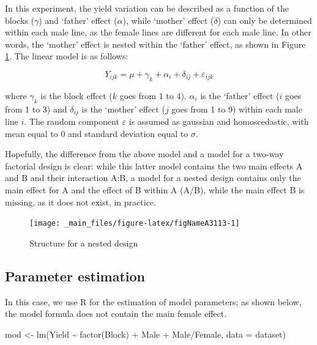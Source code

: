 \documentclass[a4paper,12pt,oneside]{book}
\newenvironment{Shaded}{\begin{snugshade}}{\end{snugshade}}
\newcommand{\SpecialCharTok}[1]{#1}
\newcommand{\OtherTok}[1]{#1}
\newcommand{\FunctionTok}[1]{#1}
\newcommand{\AttributeTok}[1]{#1}
\newcommand{\NormalTok}[1]{#1}
\begin{document}
In this experiment, the yield variation can be described as a function of the blocks (\(\gamma\)) and `father' effect (\(\alpha\)), while `mother' effect (\(\delta\)) can only be determined within each male line, as the female lines are different for each male line. In other words, the `mother' effect is nested within the `father' effect, as shown in Figure \ref{fig:figNameA3113}. The linear model is as follows:

\[Y_{ijk} = \mu + \gamma_k + \alpha_i + \delta_{ij} + \varepsilon_{ijk}\]

where \(\gamma_k\) is the block effect (\(k\) goes from 1 to 4), \(\alpha_i\) is the `father' effect (\(i\) goes from 1 to 3) and \(\delta_{ij}\) is the `mother' effect (\(j\) goes from 1 to 9) within each male line \(i\). The random component \(\varepsilon\) is assumed as gaussian and homoscedastic, with mean equal to 0 and standard deviation equal to \(\sigma\).

Hopefully, the difference from the above model and a model for a two-way factorial design is clear: while this latter model contains the two main effects A and B and their interaction A:B, a model for a nested design contains only the main effect for A and the effect of B within A (A/B), while the main effect B is missing, as it does not exist, in practice.

\begin{figure}

{\centering \texttt{[image: \_main\_files/figure-latex/figNameA3113-1]} 

}

\caption{Structure for a nested design}\label{fig:figNameA3113}
\end{figure}

\hypertarget{parameter-estimation-1}{%
\subsection{Parameter estimation}\label{parameter-estimation-1}}

In this case, we use R for the estimation of model parameters; as shown below, the model formula does not contain the main female effect.

\vspace{12pt}
\scriptsize

\begin{Shaded}
\begin{Highlighting}[]
\NormalTok{mod }\OtherTok{\textless{}{-}} \FunctionTok{lm}\NormalTok{(Yield }\SpecialCharTok{\textasciitilde{}} \FunctionTok{factor}\NormalTok{(Block) }\SpecialCharTok{+}\NormalTok{ Male }\SpecialCharTok{+}\NormalTok{ Male}\SpecialCharTok{/}\NormalTok{Female, }\AttributeTok{data =}\NormalTok{ dataset)}
\end{Highlighting}
\end{Shaded}
\end{document}
